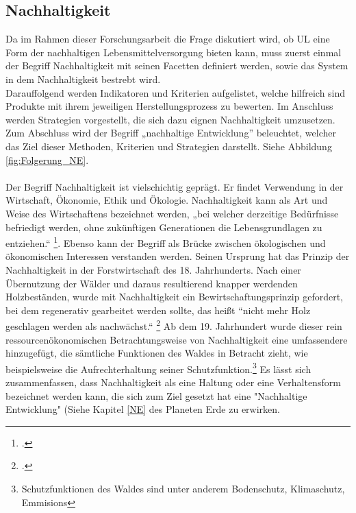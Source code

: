 \documentclass{scrartcl}
\begin{document}
\subsection{Nachhaltigkeit}
Da im Rahmen dieser Forschungsarbeit die Frage diskutiert wird, ob UL eine Form der nachhaltigen Lebensmittelversorgung bieten kann, muss zuerst einmal der Begriff Nachhaltigkeit mit seinen Facetten definiert werden, sowie das System in dem Nachhaltigkeit bestrebt wird.\\
Darauffolgend werden Indikatoren und Kriterien aufgelistet, welche hilfreich sind Produkte mit ihrem jeweiligen Herstellungsprozess zu bewerten. Im Anschluss werden Strategien vorgestellt, die sich dazu eignen Nachhaltigkeit umzusetzen.
Zum Abschluss wird der Begriff „nachhaltige Entwicklung” beleuchtet, welcher das Ziel dieser Methoden, Kriterien und Strategien darstellt. Siehe Abbildung \ref{fig:Folgerung_NE}.
\\
\\
Der Begriff Nachhaltigkeit ist vielschichtig geprägt. Er findet Verwendung in der Wirtschaft, Ökonomie, Ethik und Ökologie. Nachhaltigkeit kann als Art und Weise des Wirtschaftens bezeichnet werden, „bei welcher derzeitige Bedürfnisse befriedigt werden, ohne zukünftigen Generationen die Lebensgrundlagen zu entziehen.“ \footcite{DefinitionWirtschaftslexikonb}. Ebenso kann der Begriff als Brücke zwischen ökologischen und ökonomischen Interessen verstanden werden. Seinen Ursprung hat das Prinzip der Nachhaltigkeit in der Forstwirtschaft des 18. Jahrhunderts. Nach einer Übernutzung der Wälder und daraus resultierend knapper werdenden Holzbeständen, wurde mit Nachhaltigkeit ein Bewirtschaftungsprinzip gefordert, bei dem regenerativ gearbeitet werden sollte, das heißt “nicht mehr Holz geschlagen werden als nachwächst.“ \footcite{NachhaltigeBrockhaus.de}
Ab dem 19. Jahrhundert wurde dieser rein ressourcenökonomischen Betrachtungsweise von Nachhaltigkeit eine umfassendere hinzugefügt, die sämtliche Funktionen des Waldes in Betracht zieht, wie beispielsweise die Aufrechterhaltung seiner Schutzfunktion.\footnote{Schutzfunktionen des Waldes sind unter anderem Bodenschutz, Klimaschutz, Emmisions}
Es lässt sich zusammenfassen, dass Nachhaltigkeit als eine Haltung oder eine Verhaltensform bezeichnet werden kann, die sich zum Ziel gesetzt hat eine "Nachhaltige Entwicklung" (Siehe Kapitel \ref{NE} des Planeten Erde zu erwirken.
\end{document}

